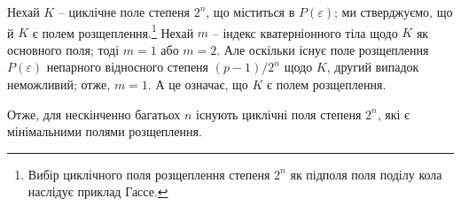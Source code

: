 \documentclass[11pt]{article}
\begin{document}
Нехай $K$ -- циклічне поле степеня $2^n$, що міститься в $P(\varepsilon)$; ми стверджуємо, що й $K$ є полем розщеплення.\footnote{Вибір циклічного поля розщеплення степеня $2^n$ як підполя поля поділу кола наслідує приклад Гассе.} Нехай $m$ -- індекс кватерніонного тіла щодо $K$ як основного поля; тоді $m=1$ або $m=2$. Але оскільки існує поле розщеплення $P(\varepsilon)$ непарного відносного степеня $(p-1)/2^n$ щодо $K$, другий випадок неможливий; отже, $m=1$. А це означає, що $K$ є полем розщеплення.

Отже, для нескінченно багатьох $n$ існують циклічні поля степеня $2^n$, які є мінімальними полями розщеплення.
\end{document}

